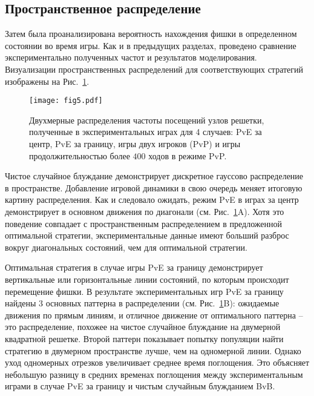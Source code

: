 \subsection{Пространственное распределение}\label{subsec:ch3/sec4/sub4}

Затем была проанализирована вероятность нахождения фишки в определенном состоянии во время игры. Как и в предыдущих разделах, проведено сравнение экспериментально полученных частот и результатов моделирования. Визуализации пространственных распределений для соответствующих стратегий изображены на Рис.~\cref{fig:distribution_states}.

\begin{figure}[t]
    \centering
    \texttt{[image: fig5.pdf]}
    \caption{
        Двухмерные распределения частоты посещений узлов решетки, полученные в экспериментальных играх для 4 случаев: 
        PvE за центр, PvE за границу, игры двух игроков (PvP) и игры продолжительностью более $400$ ходов в режиме PvP.
    }  
    \label{fig:distribution_states}
    
\end{figure}

Чистое случайное блуждание демонстрирует дискретное гауссово распределение в пространстве. Добавление игровой динамики в свою очередь меняет итоговую картину распределения. Как и следовало ожидать, режим PvE в играх за центр демонстрирует в основном движения по диагонали (см. Рис.~\cref{fig:distribution_states}A). Хотя это поведение совпадает с пространственным распределением в предложенной оптимальной стратегии, экспериментальные данные имеют больший разброс вокруг диагональных состояний, чем для оптимальной стратегии.

Оптимальная стратегия в случае игры PvE за границу демонстрирует вертикальные или горизонтальные линии состояний, по которым происходит перемещение фишки. В результате экспериментальных игр PvE за границу найдены 3 основных паттерна в распределении (см. Рис.~\cref{fig:distribution_states}B): ожидаемые движения по прямым линиям, и отличное движение от оптимального паттерна -- это распределение, похожее на чистое случайное блуждание на двумерной квадратной решетке. Второй паттерн показывает попытку популяции найти стратегию в двумерном пространстве лучше, чем на одномерной линии. Однако уход одномерных отрезков увеличивает среднее время поглощения. Это объясняет небольшую разницу в средних временах поглощения между экспериментальным играми в случае PvE за границу и чистым случайным блужданием BvB.

